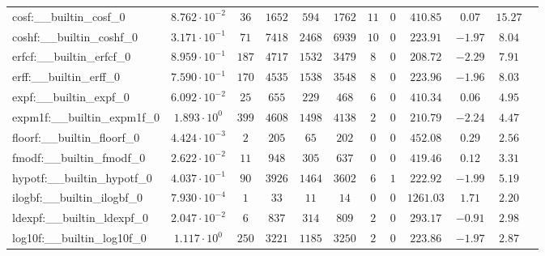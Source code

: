 \begin{tabular}{|l|c|c|c|c|c|c|c|c|c|c|c|}
cosf:\_\_builtin\_cosf\_0                 & $ 8.762 \cdot 10^{-2} $ & $ 36     $ & $ 1652   $ & $ 594   $ & $ 1762   $ & $ 11  $ & $ 0 $ & $ 410.85      $ & $ 0.07    $ & $ 15.27   $ \\
coshf:\_\_builtin\_coshf\_0               & $ 3.171 \cdot 10^{-1} $ & $ 71     $ & $ 7418   $ & $ 2468  $ & $ 6939   $ & $ 10  $ & $ 0 $ & $ 223.91      $ & $ -1.97   $ & $ 8.04    $ \\
erfcf:\_\_builtin\_erfcf\_0               & $ 8.959 \cdot 10^{-1} $ & $ 187    $ & $ 4717   $ & $ 1532  $ & $ 3479   $ & $ 8   $ & $ 0 $ & $ 208.72      $ & $ -2.29   $ & $ 7.91    $ \\
erff:\_\_builtin\_erff\_0                 & $ 7.590 \cdot 10^{-1} $ & $ 170    $ & $ 4535   $ & $ 1538  $ & $ 3548   $ & $ 8   $ & $ 0 $ & $ 223.96      $ & $ -1.96   $ & $ 8.03    $ \\
expf:\_\_builtin\_expf\_0                 & $ 6.092 \cdot 10^{-2} $ & $ 25     $ & $ 655    $ & $ 229   $ & $ 468    $ & $ 6   $ & $ 0 $ & $ 410.34      $ & $ 0.06    $ & $ 4.95    $ \\
expm1f:\_\_builtin\_expm1f\_0             & $ 1.893 \cdot 10^{0}  $ & $ 399    $ & $ 4608   $ & $ 1498  $ & $ 4138   $ & $ 2   $ & $ 0 $ & $ 210.79      $ & $ -2.24   $ & $ 4.47    $ \\
floorf:\_\_builtin\_floorf\_0             & $ 4.424 \cdot 10^{-3} $ & $ 2      $ & $ 205    $ & $ 65    $ & $ 202    $ & $ 0   $ & $ 0 $ & $ 452.08      $ & $ 0.29    $ & $ 2.56    $ \\
fmodf:\_\_builtin\_fmodf\_0               & $ 2.622 \cdot 10^{-2} $ & $ 11     $ & $ 948    $ & $ 305   $ & $ 637    $ & $ 0   $ & $ 0 $ & $ 419.46      $ & $ 0.12    $ & $ 3.31    $ \\
hypotf:\_\_builtin\_hypotf\_0             & $ 4.037 \cdot 10^{-1} $ & $ 90     $ & $ 3926   $ & $ 1464  $ & $ 3602   $ & $ 6   $ & $ 1 $ & $ 222.92      $ & $ -1.99   $ & $ 5.19    $ \\
ilogbf:\_\_builtin\_ilogbf\_0             & $ 7.930 \cdot 10^{-4} $ & $ 1      $ & $ 33     $ & $ 11    $ & $ 14     $ & $ 0   $ & $ 0 $ & $ 1261.03     $ & $ 1.71    $ & $ 2.20    $ \\
ldexpf:\_\_builtin\_ldexpf\_0             & $ 2.047 \cdot 10^{-2} $ & $ 6      $ & $ 837    $ & $ 314   $ & $ 809    $ & $ 2   $ & $ 0 $ & $ 293.17      $ & $ -0.91   $ & $ 2.98    $ \\
log10f:\_\_builtin\_log10f\_0             & $ 1.117 \cdot 10^{0}  $ & $ 250    $ & $ 3221   $ & $ 1185  $ & $ 3250   $ & $ 2   $ & $ 0 $ & $ 223.86      $ & $ -1.97   $ & $ 2.87    $ \\

\end{tabular}
